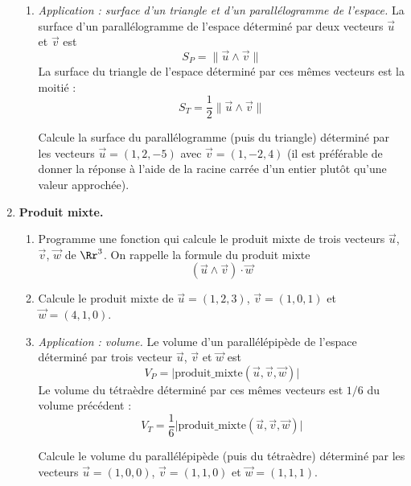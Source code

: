 \documentclass[11pt,class=report,crop=false]{standalone}
\begin{document}
\begin{activite}[Vecteurs]
\begin{enumerate}
\begin{enumerate}
		\item \emph{Application : surface d'un triangle et d'un parallélogramme de l'espace.}
		La surface d'un parallélogramme de l'espace déterminé par deux vecteurs $\vec u$ et $\vec v$ est
		$$S_P = \| \vec u \wedge \vec v \|$$
		La surface du triangle de l'espace déterminé par ces mêmes vecteurs est la moitié :
		$$S_T = \frac 12 \| \vec u \wedge \vec v \|$$
		
		
		Calcule la surface du parallélogramme (puis du triangle) déterminé par les vecteurs
		$\vec u = (1,2,-5)$ avec $\vec v = (1,-2,4)$ (il est préférable de donner la réponse à l'aide de la racine carrée d'un entier plutôt qu'une valeur approchée).
		
	\end{enumerate} 		
		
	\item \textbf{Produit mixte.}

	\begin{enumerate}
		\item  Programme une fonction  qui calcule le produit mixte de trois vecteurs $\vec u$, $\vec v$, $\vec w$ de $\Rr^3$. On rappelle la formule du produit mixte 
		$$(\vec u \wedge \vec v) \cdot \vec w$$
	
		\item Calcule le produit mixte de $\vec u = (1,2,3)$, $\vec v = (1,0,1)$ et $\vec w = (4,1,0)$.
	
		\item \emph{Application : volume.}
		Le volume d'un parallélépipède de l'espace déterminé par trois vecteur $\vec u$, $\vec v$ et $\vec w$ est
		$$V_P = \big|\text{produit\_mixte}(\vec u,\vec v,\vec w)\big|$$
		Le volume du tétraèdre déterminé par ces mêmes vecteurs est $1/6$ du volume précédent :
		$$V_T = \frac 16 \big|\text{produit\_mixte}(\vec u,\vec v,\vec w) \big|$$
		
		
		Calcule le volume du parallélépipède (puis du tétraèdre) déterminé par les vecteurs
		$\vec u = (1,0,0)$, $\vec v = (1,1,0)$ et $\vec w = (1,1,1)$.
		
	\end{enumerate}
\end{enumerate}
	
\end{activite}
\end{document}
